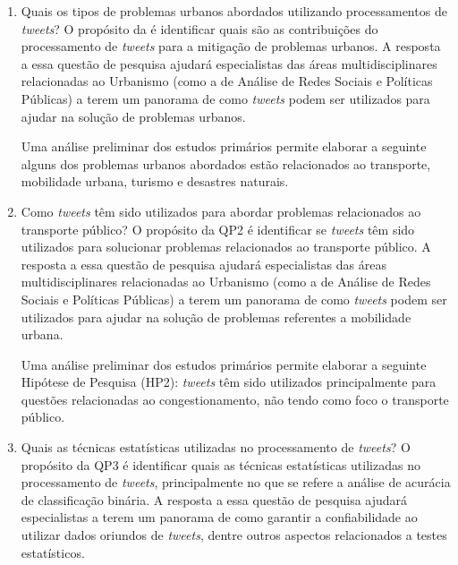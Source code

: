 \documentclass[
	12pt,				%
	oneside,			%
	a4paper,			%
	english,			%
	brazil				%
	]{abntex2ppgsi}
\begin{document}
\begin{enumerate}

\item Quais os tipos de problemas urbanos abordados utilizando processamentos de \textit{tweets}?
\label{item:1} \newline \newline
O propósito da  é identificar quais são as contribuições do processamento de \textit{tweets} para a mitigação de problemas urbanos. A resposta a essa questão de pesquisa ajudará especialistas das áreas multidisciplinares relacionadas ao Urbanismo (como a de Análise de Redes Sociais e Políticas Públicas) a terem um panorama de como \textit{tweets} podem ser utilizados para ajudar na solução de problemas urbanos. \newline

Uma análise preliminar dos estudos primários permite elaborar a seguinte  alguns dos problemas urbanos abordados estão relacionados ao transporte, mobilidade urbana, turismo e desastres naturais. \newline

\item Como \textit{tweets} têm sido utilizados para abordar problemas relacionados ao transporte público? \newline \newline
\label{item:2}
O propósito da QP2 é identificar se \textit{tweets} têm sido utilizados para solucionar problemas relacionados ao transporte público. A resposta a essa questão de pesquisa ajudará especialistas das áreas multidisciplinares relacionadas ao Urbanismo (como a de Análise de Redes Sociais e Políticas Públicas) a terem um panorama de como \textit{tweets} podem ser utilizados para ajudar na solução de problemas referentes a mobilidade urbana. \newline

Uma análise preliminar dos estudos primários permite elaborar a seguinte Hipótese de Pesquisa (HP2): \textit{tweets} têm sido utilizados principalmente para questões relacionadas ao congestionamento, não tendo como foco o transporte público.\newline

\item Quais as técnicas estatísticas utilizadas no processamento de \textit{tweets}?
\label{item:3} \newline \newline
O propósito da QP3 é identificar quais as técnicas estatísticas utilizadas no processamento de \textit{tweets}, principalmente no que se refere a análise de acurácia de classificação binária. A resposta a essa questão de pesquisa ajudará especialistas a terem um panorama de como garantir a confiabilidade ao utilizar dados oriundos de \textit{tweets}, dentre outros aspectos relacionados a testes estatísticos. \newline


\end{enumerate}
\end{document}
